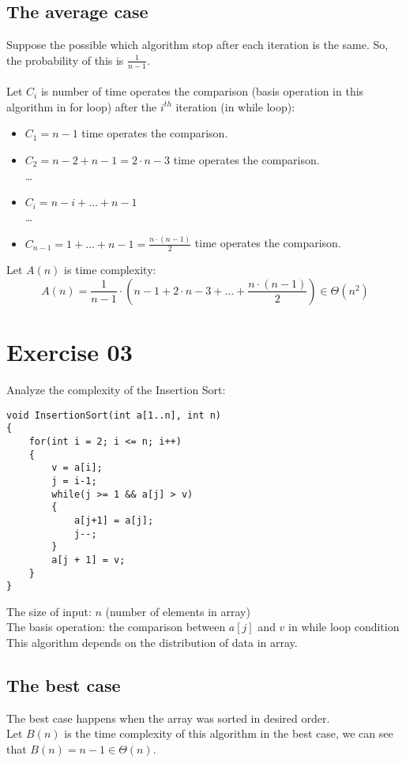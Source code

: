 \documentclass[a4paper]{article}
\begin{document}
\subsection{The average case}
Suppose the possible which algorithm stop after each iteration is the same. So, the probability of this is $\frac{1}{n-1}$. \\
\\
Let $C_i$ is number of time operates the comparison (basis operation in this algorithm in for loop) after the $i^{th}$ iteration (in while loop):
\begin{itemize}
    \item $C_1 = n-1$ time operates the comparison.
    \item $C_2 = n-2 + n-1 = 2 \cdot n - 3$ time operates the comparison.
    \\
    \ldots
    \item $C_i = n-i + \ldots + n-1$
    \\
    \ldots 
    \item $C_{n-1} = 1 + ... + n-1 = \frac{n \cdot (n-1)}{2}$ time operates the comparison.
\end{itemize}
Let $A(n)$ is time complexity:
\begin{equation*}
    A(n) = \frac{1}{n-1} \cdot (n-1 + 2 \cdot n -3 + ... + \frac{n \cdot (n-1)}{2}) \in \Theta(n^2)
\end{equation*}

\newpage
\section{Exercise 03}
Analyze the complexity of the Insertion Sort:
\begin{lstlisting}
void InsertionSort(int a[1..n], int n) 
{
    for(int i = 2; i <= n; i++)
    {
        v = a[i];
        j = i-1;
        while(j >= 1 && a[j] > v) 
        {
            a[j+1] = a[j];
            j--;
        }
        a[j + 1] = v;
    }
}
\end{lstlisting}
The size of input: $n$ (number of elements in array) \\
The basis operation: the comparison between $a[j]$ and $v$ in while loop condition \\
This algorithm depends on the distribution of data in array. 
\subsection{The best case}
The best case happens when the array was sorted in desired order. \\
Let $B(n)$ is the time complexity of this algorithm in the best case, we can see that $B(n) = n-1 \in \Theta(n)$.
\end{document}
